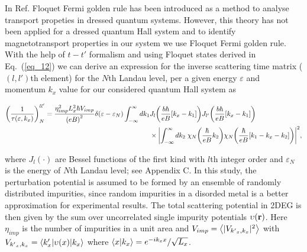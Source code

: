 In Ref. \cite{wackerl20} Floquet Fermi golden rule has been introduced as a method to analyse transport propeties in dressed quantum systems. However, this theory has not been applied for a dressed quantum Hall system and to identify magnetotransport properties in our system we use Floquet Fermi golden rule.
With the help of $t-t'$ formalism \cite{wackerl20,grifoni98,sambe75,peskin93,althorpe97} and using Floquet states derived in Eq.~(\ref{eq_12}) we can derive an  expression for the inverse scattering time matrix ($(l,l')$th element) for the $N$th Landau level, per a given energy $\varepsilon$ and momentum $k_x$ value for our considered quantum Hall system as
\begin{widetext}
\begin{equation} \label{eq_13}
  \begin{aligned}
    \qty(\frac{1}{\tau(\varepsilon,k_x)})^{ll'}_{N} =
    \frac { \eta_{imp}^2 L_x^2 \hbar V_{imp}}{\qty(eB)^2}
    \delta(\varepsilon - \varepsilon_{N})
    \int_{-\infty}^{\infty} d k_1
    &
    J_l\qty(\frac{b\hbar}{eB}[{k}_x - k_1])
    J_{l'}\qty(\frac{b\hbar}{eB}[{k}_x - k_1]) \\
    & \times
    \qty|
    \int_{-\infty}^{\infty} dk_2 \;
    {\chi}_{N}\qty(\frac{\hbar}{eB}k_2)
    {\chi}_{N}\qty(\frac{\hbar}{eB} \qty[k_1 - {k}_x - k_2])|^2,
  \end{aligned}
\end{equation}
\end{widetext}
where $J_l(\cdot)$ are Bessel functions of the first kind with $l$th integer order and $\varepsilon_N$ is the energy of $N$th Landau level; see Appendix C. In this study, the perturbation potential is assumed to be formed by an ensemble of randomly distributed impurities, since random impurities in a disorded metal is a better approximation for experimental results. The total  scattering potential in 2DEG is then given by the sum over uncorrelated single impurity potentials $\upsilon(\vb{r})$. Here $\eta_{imp}$ is the number of impurities in a unit area and $V_{imp} = \expval{|V_{{k'}_x,k_x}|^2}$ with $V_{{k'}_x,k_x} = \mel**{k'_x}{\upsilon(x) }{k_x}$ where $\braket{x}{k_x} = e^{-ik_x x}/\sqrt{L_x}$.

